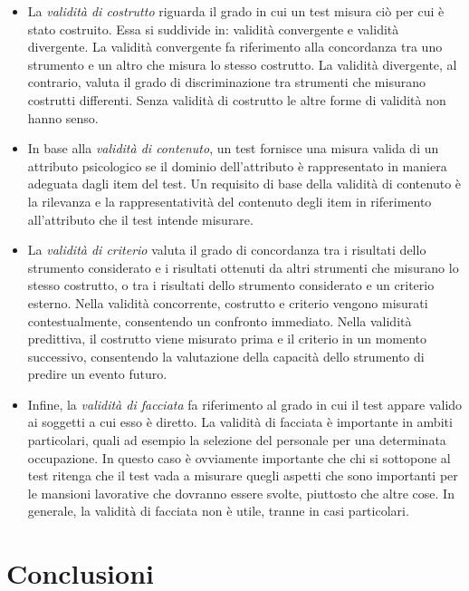 \documentclass[
  11pt,
]{krantz}
\providecommand{\tightlist}{%
  \setlength{\itemsep}{0pt}\setlength{\parskip}{0pt}}
\theoremstyle{definition}
\theoremstyle{definition}
\theoremstyle{definition}
\theoremstyle{definition}
\theoremstyle{remark}
\begin{document}
\begin{itemize}
\tightlist
\item
  La \emph{validità di costrutto} riguarda il grado in cui un test misura ciò per cui è stato costruito. Essa si suddivide in: validità convergente e validità divergente. La validità convergente fa riferimento alla concordanza tra uno strumento e un altro che misura lo stesso costrutto. La validità divergente, al contrario, valuta il grado di discriminazione tra strumenti che misurano costrutti differenti. Senza validità di costrutto le altre forme di validità non hanno senso.
\item
  In base alla \emph{validità di contenuto}, un test fornisce una misura valida di un attributo psicologico se il dominio dell'attributo è rappresentato in maniera adeguata dagli item del test. Un requisito di base della validità di contenuto è la rilevanza e la rappresentatività del contenuto degli item in riferimento all'attributo che il test intende misurare.
\item
  La \emph{validità di criterio} valuta il grado di concordanza tra i risultati dello strumento considerato e i risultati ottenuti da altri strumenti che misurano lo stesso costrutto, o tra i risultati dello strumento considerato e un criterio esterno. Nella validità concorrente, costrutto e criterio vengono misurati contestualmente, consentendo un confronto immediato. Nella validità predittiva, il costrutto viene misurato prima e il criterio in un momento successivo, consentendo la valutazione della capacità dello strumento di predire un evento futuro.
\item
  Infine, la \emph{validità di facciata} fa riferimento al grado in cui il test appare valido ai soggetti a cui esso è diretto. La validità di facciata è importante in ambiti particolari, quali ad esempio la selezione del personale per una determinata occupazione. In questo caso è ovviamente importante che chi si sottopone al test ritenga che il test vada a misurare quegli aspetti che sono importanti per le mansioni lavorative che dovranno essere svolte, piuttosto che altre cose. In generale, la validità di facciata non è utile, tranne in casi particolari.
\end{itemize}

\hypertarget{conclusioni}{%
\section*{Conclusioni}\label{conclusioni}}
\end{document}
